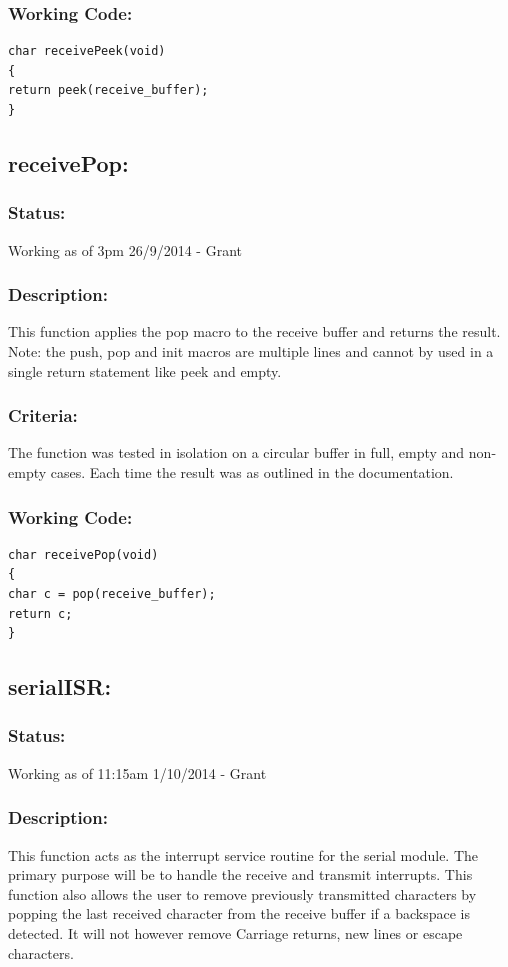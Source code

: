 \documentclass[]{report}
\begin{document}
\subsubsection{Working Code:}
\begin{lstlisting}
char receivePeek(void)
{
return peek(receive_buffer);
}
\end{lstlisting}

\subsection{receivePop:}
\subsubsection{Status:}
Working as of 3pm 26/9/2014 - Grant

\subsubsection{Description:}
This function applies the pop macro to the receive buffer and returns the result. Note: the push, pop and init macros are multiple lines and cannot by used in a single return statement like peek and empty.

\subsubsection{Criteria:}
The function was tested in isolation on a circular buffer in full, empty and non-empty cases. Each time the result was as outlined in the documentation.

\subsubsection{Working Code:}
\begin{lstlisting}
char receivePop(void)
{
char c = pop(receive_buffer);
return c;
}
\end{lstlisting}

\subsection{serialISR:}
\subsubsection{Status:}
Working as of 11:15am 1/10/2014 - Grant

\subsubsection{Description:}
This function acts as the interrupt service routine for the serial module. The primary purpose will be to handle the receive and transmit interrupts. This function also allows the user to remove previously transmitted characters by popping the last received character from the receive buffer if a backspace is detected. It will not however remove Carriage returns, new lines or escape characters.
\end{document}
